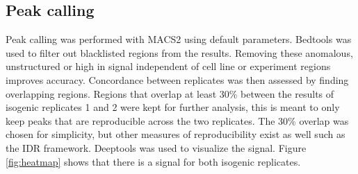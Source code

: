 \documentclass{article}
\begin{document}



\subsection{Peak calling}



Peak calling was performed with MACS2\cite{gaspar2018improved} using default parameters. Bedtools\cite{quinlan2010bedtools} was used to filter out blacklisted regions from the results. Removing these anomalous, unstructured or high in signal independent of cell line or experiment regions improves accuracy\cite{amemiya2019encode}. Concordance between replicates was then assessed by finding overlapping regions. Regions that overlap at least 30\% between the results of isogenic replicates 1 and 2 were kept for further analysis, this is meant to only keep peaks that are reproducible across the two replicates. The 30\% overlap was chosen for simplicity, but other measures of reproducibility exist as well such as the IDR framework\cite{li2011measuring}. Deeptools\cite{ramirez2014deeptools} was used to visualize the signal. Figure \ref{fig:heatmap} shows that there is a signal for both isogenic replicates.
\end{document}
